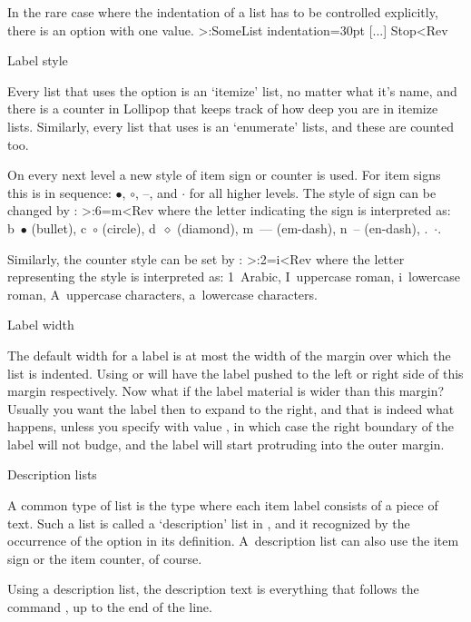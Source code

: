 In the rare case where the indentation of a list has to be controlled
explicitly, there is an option  with one value.
\Ver>\DefineList:SomeList indentation=30pt [...] Stop<Rev


\Section Label style

Every list that uses the  option is an `itemize' list,
no matter what it's name, and there is a counter in Lollipop that
keeps track of how deep you are in itemize lists. Similarly, every
list that uses  is an `enumerate' lists, and these
are counted too.

On every next level a new style of item sign or counter is used. For
item signs this is in sequence: $\bullet$, $\circ$, --, and $\cdot$
for all higher levels. The style of sign can be changed by
: \Ver>\SetItemSign:6=m<Rev where the letter
indicating the sign is interpreted as: \n b~$\bullet$ (bullet), \n
c~$\circ$ (circle), \n d~$\diamond$ (diamond), \n m~--- (em-dash), \n
n~-- (en-dash), \n .~$\cdot$.

Similarly, the counter style can be set by
:
\Ver>\SetItemCounterRepresentation:2=i<Rev where the letter
representing the style is interpreted as: 1~Arabic, I~uppercase roman,
i~lowercase roman, A~uppercase characters, a~lowercase characters.

\Section Label width

The default width for a label is at most the width of the margin over
which the list is indented. Using  or 
will have the label pushed to the left or right side of this margin
respectively. Now what if the label material is wider than this
margin? Usually you want the label then to expand to the right, and
that is indeed what happens, unless you specify
 with value , in which case the right
boundary of the label will not budge, and the label will start
protruding into the outer margin.

 Description lists

A common type of list is the type where each item label consists of a
piece of text. Such a list is called a `description' list in
\Lollipop, and it recognized by the occurrence of the option
 in its definition. A~description list can also use
the item sign or the item counter, of course.

Using a description list, the description text is everything that
follows the command , up to the end of the line.

